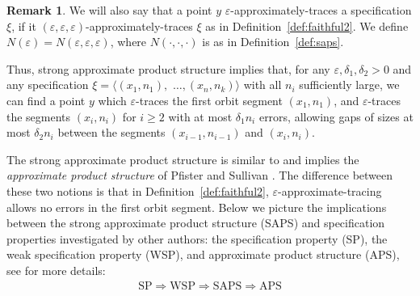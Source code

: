 \documentclass{amsart}
\theoremstyle{definition}
\newtheorem{rem}[thm]{Remark}
\newcommand{\eps}{\varepsilon}
\begin{document}
\begin{rem}\label{rem:N}
We will also say that a point $y$ $\eps$-approximately-traces a specification $\xi$, if it $(\eps, \eps, \eps)$-approximately-traces $\xi$ as in Definition~\ref{def:faithful2}. We define $N(\eps) = N(\eps, \eps, \eps)$, where $N(\cdot,\cdot,\cdot)$ is as in Definition~\ref{def:saps}. %
\end{rem}



Thus, strong approximate product structure implies that, for any $\eps, \delta_1,\delta_2>0$ and any
specification $\xi= \langle (x_1,n_1),$ $ \dots, (x_n,n_k)\rangle $
with all $n_i$ sufficiently large, we can find a point $y$
which $\eps$-traces the first orbit segment $(x_1,n_1)$,
and $\eps$-traces the segments $(x_i,n_i)$ for $i\ge 2$ with at most
$\delta_1 n_i$ errors, allowing gaps of sizes at most $\delta_2 n_i$
between the segments $(x_{i-1}, n_{i-1})$ and $(x_i,n_i)$.


The strong approximate product structure is similar to and implies the \emph{approximate product structure} of Pfister and
Sullivan \cite{PS}. The difference between these two notions is that in Definition~\ref{def:faithful2},
 $\eps$-approximate-tracing allows no errors in the first orbit segment. Below we picture the implications between the strong approximate product structure (SAPS) and specification properties investigated by other authors: the specification property (SP), the weak specification property (WSP), and approximate product structure (APS), see \cite{KLO} for more details:
\begin{gather*}
\textrm{SP}  \Rightarrow
\textrm{WSP} \Rightarrow
\textrm{SAPS} \Rightarrow
\textrm{APS}
\end{gather*}
\end{document}

